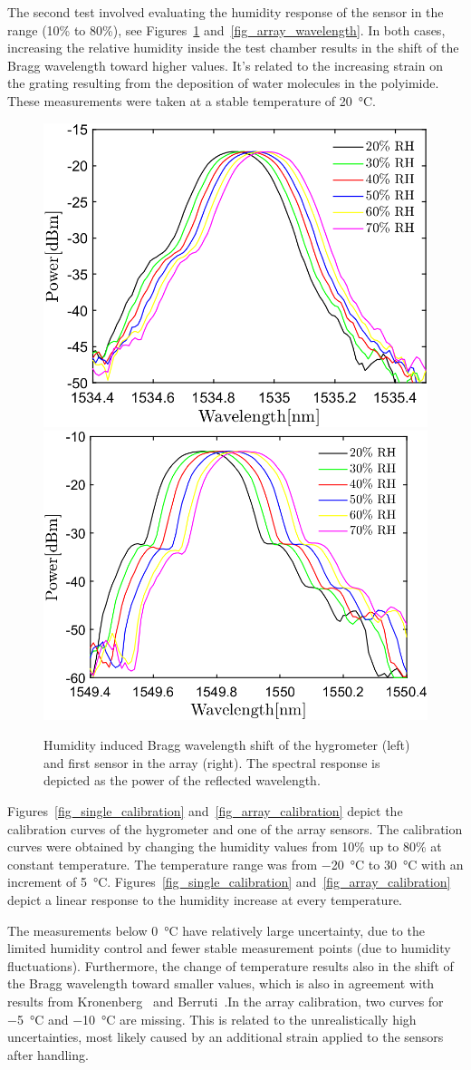 The second test involved evaluating the humidity response of the sensor in the range (10\% to 80\%), see Figures~\ref{fig_response} and~\ref{fig_array_wavelength}. In both cases, increasing the relative humidity inside the test chamber results in the shift of the Bragg wavelength toward higher values. It's related to the increasing strain on the grating resulting from the deposition of water molecules in the polyimide. These measurements were taken at a stable temperature of \SI{20}{\celsius}.
\begin{figure}[!h]
\centering
\includegraphics[width=0.45\columnwidth]{Chapter5/images/rh.png}
\includegraphics[width=0.475\columnwidth]{Chapter5/images/rh_array2.png}
\caption{Humidity induced Bragg wavelength shift of the hygrometer (left) and first sensor in the array (right). The spectral response is depicted as the power of the reflected wavelength. }
\label{fig_response}
\end{figure}
\newpage
Figures~\ref{fig_single_calibration} and~\ref{fig_array_calibration} depict the calibration curves of the hygrometer and one of the array sensors. The calibration curves were obtained by changing the humidity values from 10\% up to 80\% at constant temperature. The temperature range was from \SI{-20}{\celsius} to \SI{30}{\celsius} with an increment of \SI{5}{\celsius}. Figures~\ref{fig_single_calibration} and~\ref{fig_array_calibration} depict a linear response to the humidity increase at every temperature.

The measurements below \SI{0}{\celsius} have relatively large uncertainty, due to the limited humidity control and fewer stable measurement points (due to humidity fluctuations). Furthermore, the change of temperature results also in the shift of the Bragg wavelength toward smaller values, which is also in agreement with results from Kronenberg~\cite{Kronenberg:02} and Berruti~\cite{Berruti}.In the array calibration, two curves for \SI{-5}{\celsius} and \SI{-10}{\celsius} are missing. This is related to the unrealistically high uncertainties, most likely caused by an additional strain applied to the sensors after handling. %

